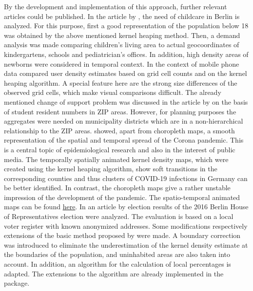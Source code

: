 By the development and implementation of this approach, further relevant articles could be published. 
In the article by \cite{Rendtel2018}, the need of childcare in Berlin is analyzed. For this purpose, first a good representation of the population  below 18 was obtained by the above mentioned kernel heaping method. Then, a demand analysis was made comparing children's living area to actual geocoordinates of kindergartens, schools and pediatrician's offices. In addition, high density areas of newborns were considered in temporal context. 
In the context of mobile phone data \cite{Hadam2020} compared user density estimates based on grid cell counts and on the kernel heaping algorithm.
A special feature here are the strong size differences of the observed grid cells, which make visual comparisons difficult. 
The already mentioned change of support problem was discussed in the article by \cite{StudentResidents} on the basis of student resident numbers in ZIP areas. However, for planning purposes the aggregates were needed on municipality districts which are in a non-hierarchical relationship to the ZIP areas. 
\cite{Rendtel2021} showed, apart from choropleth maps, a smooth representation of the spatial and temporal spread of the Corona pandemic. This is a central topic of epidemiological research and also in the interest of public media.
The temporally spatially animated kernel density maps, which were created using the kernel heaping algorithm, show soft transitions in the corresponding counties and thus clusters of COVID-19 infections in Germany can be better identified. In contrast, the choropleth maps give a rather unstable impression of the development of the pandemic. 
The spatio-temporal animated maps can be found \hyperlink{https://www.inwt-statistics.com/blog/covid-19_heat-map_of-local_7-day_incidences_over_time}{here}.
In an article by \cite{KHCompositeData} election results of the 2016 Berlin House of Representatives election were analyzed. The evaluation is based on a local voter register with known anonymized addresses. Some modifications respectively extensions of the basic method proposed by \cite{MigranteAndAgedPeople} were made. A boundary correction was introduced to eliminate the underestimation of the kernel density estimate at the boundaries of the population, and uninhabited areas are also taken into account. In addition, an algorithm for the calculation of local percentages is adapted. The extensions to the algorithm are already implemented in the \hyperlink{https://cran.r-project.org/web/packages/Kernelheaping/index.html}{} package. 


